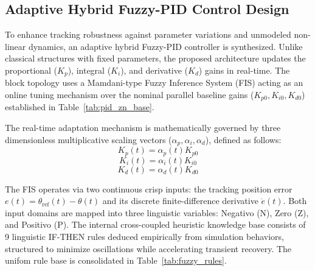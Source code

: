 \documentclass[pdflatex,sn-mathphys-num,iicol]{sn-jnl}
\theoremstyle{thmstyleone}%
\theoremstyle{thmstyletwo}%
\theoremstyle{thmstylethree}%
\begin{document}
\subsection{Adaptive Hybrid Fuzzy-PID Control Design}
\label{sub:fuzzy_pid}

To enhance tracking robustness against parameter variations and unmodeled non-linear dynamics, an adaptive hybrid Fuzzy-PID controller is synthesized. Unlike classical structures with fixed parameters, the proposed architecture updates the proportional ($K_p$), integral ($K_i$), and derivative ($K_d$) gains in real-time. The block topology uses a Mamdani-type Fuzzy Inference System (FIS) acting as an online tuning mechanism over the nominal parallel baseline gains ($K_{p0}, K_{i0}, K_{d0}$) established in Table~\ref{tab:pid_zn_base}. 

The real-time adaptation mechanism is mathematically governed by three dimensionless multiplicative scaling vectors ($\alpha_p, \alpha_i, \alpha_d$), defined as follows:
\begin{equation}
K_p(t) = \alpha_p(t)  K_{p0}
\label{eq:fuzzy_kp}
\end{equation}
\begin{equation}
K_i(t) = \alpha_i(t)  K_{i0}
\label{eq:fuzzy_ki}
\end{equation}
\begin{equation}
K_d(t) = \alpha_d(t)  K_{d0}
\label{eq:fuzzy_kd}
\end{equation}

The FIS operates via two continuous crisp inputs: the tracking position error $e(t) = \theta_{\text{ref}}(t) - \theta(t)$ and its discrete finite-difference derivative $\dot{e}(t)$. Both input domains are mapped into three linguistic variables: Negativo (N), Zero (Z), and Positivo (P). The internal cross-coupled heuristic knowledge base consists of 9 linguistic IF-THEN rules deduced empirically from simulation behaviors, structured to minimize oscillations while accelerating transient recovery. The unifom rule base is consolidated in Table~\ref{tab:fuzzy_rules}.
\end{document}
